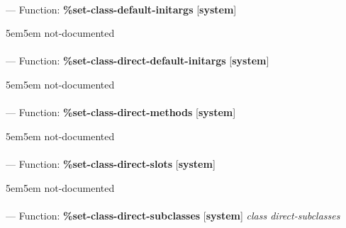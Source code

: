 \paragraph{}
\label{SYSTEM:SET-CLASS-DEFAULT-INITARGS}
--- Function: \textbf{\%set-class-default-initargs} [\textbf{system}] \textit{}

\begin{adjustwidth}{5em}{5em}
not-documented
\end{adjustwidth}

\paragraph{}
\label{SYSTEM:SET-CLASS-DIRECT-DEFAULT-INITARGS}
--- Function: \textbf{\%set-class-direct-default-initargs} [\textbf{system}] \textit{}

\begin{adjustwidth}{5em}{5em}
not-documented
\end{adjustwidth}

\paragraph{}
\label{SYSTEM:SET-CLASS-DIRECT-METHODS}
--- Function: \textbf{\%set-class-direct-methods} [\textbf{system}] \textit{}

\begin{adjustwidth}{5em}{5em}
not-documented
\end{adjustwidth}

\paragraph{}
\label{SYSTEM:SET-CLASS-DIRECT-SLOTS}
--- Function: \textbf{\%set-class-direct-slots} [\textbf{system}] \textit{}

\begin{adjustwidth}{5em}{5em}
not-documented
\end{adjustwidth}

\paragraph{}
\label{SYSTEM:SET-CLASS-DIRECT-SUBCLASSES}
--- Function: \textbf{\%set-class-direct-subclasses} [\textbf{system}] \textit{class direct-subclasses}

